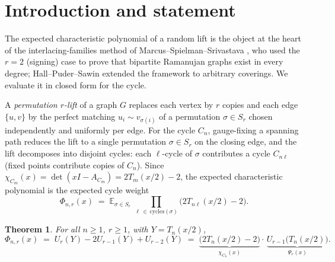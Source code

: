 \documentclass[11pt]{article}
\newtheorem{theorem}{Theorem}
\theoremstyle{remark}
\newcommand{\E}{\mathbb{E}}
\begin{document}
\section{Introduction and statement}

The expected characteristic polynomial of a random lift is the object at the
heart of the interlacing-families method of Marcus--Spielman--Srivastava
\cite{MSS}, who used the $r=2$ (signing) case to prove that bipartite Ramanujan
graphs exist in every degree; Hall--Puder--Sawin \cite{HPS} extended the
framework to arbitrary coverings. We evaluate it in closed form for the cycle.

A \emph{permutation $r$-lift} of a graph $G$ replaces each vertex by $r$
copies and each edge $\{u,v\}$ by the perfect matching $u_i\sim v_{\sigma(i)}$
of a permutation $\sigma\in S_r$ chosen independently and uniformly per edge.
For the cycle $C_n$, gauge-fixing a spanning path reduces the lift to a single
permutation $\sigma\in S_r$ on the closing edge, and the lift decomposes into
disjoint cycles: each $\ell$-cycle of $\sigma$ contributes a cycle $C_{n\ell}$
(fixed points contribute copies of $C_n$). Since
$\chi_{C_m}(x)=\det(xI-A_{C_m})=2T_m(x/2)-2$, the expected characteristic
polynomial is the expected cycle weight
\begin{equation}\label{eq:avg}
\Phi_{n,r}(x)\;=\;\E_{\sigma\in S_r}\;
\prod_{\ell\,\in\,\mathrm{cycles}(\sigma)}\bigl(2T_{n\ell}(x/2)-2\bigr).
\end{equation}

\begin{theorem}\label{thm:main}
For all $n\ge 1$, $r\ge 1$, with $Y=T_n(x/2)$,
\[
\Phi_{n,r}(x)\;=\;U_r(Y)-2U_{r-1}(Y)+U_{r-2}(Y)
\;=\;\underbrace{\bigl(2T_n(x/2)-2\bigr)}_{\chi_{C_n}(x)}\cdot\,
\underbrace{U_{r-1}\bigl(T_n(x/2)\bigr)}_{\Psi_r(x)} .
\]
\end{theorem}
\end{document}
